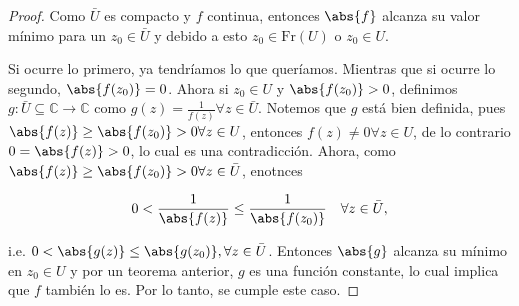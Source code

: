 \documentclass[../main.tex]{subfiles}
\begin{document}
\begin{proof}
    Como \(\bar{U}\) es compacto y \(f\) continua, entonces \(\abs{f}\) alcanza su valor
    mínimo para un \(z_{0}\in \bar{U}\) y debido a esto \(z_{0}\in \mathrm{Fr}(U)\) o
    \(z_{0}\in  U\).

    Si ocurre lo primero, ya tendríamos lo que queríamos. Mientras que si ocurre lo
    segundo, \(\abs{f(z_{0})} = 0\). Ahora si \(z_{0}\in  U\) y \(\abs{f(z_{0})} > 0\),
    definimos \(g \colon \bar{U}\subseteq \mathbb{C} \to \mathbb{C}\) como \(g(z) =
    \tfrac{1}{f(z)} \forall z\in \bar{U}\).
    Notemos que \(g\) está bien definida, pues \(\abs{f(z)} \geq
        \abs{f(z_{0})} > 0 \forall
    z\in U\), entonces \(f(z) \neq 0 \forall z\in U\), de lo contrario \(0 =
        \abs{f(z)} >
    0\), lo cual es una contradicción.
    Ahora, como \(\abs{f(z)} \geq \abs{f(z_{0})} > 0 \forall z\in \bar{U}\), enotnces

    \begin{equation*}
        0 < \dfrac{1}{\abs{f(z)}} \leq \dfrac{1}{\abs{f(z_{0})}}\quad \forall
        z\in \bar{U},
    \end{equation*}

    i.e. \(0 < \abs{g(z)} \leq \abs{g(z_{0})}, \forall z\in \bar{U}\).
    Entonces \(\abs{g}\)
    alcanza su mínimo en \(z_{0} \in U\) y por un teorema anterior, \(g\) es una función
    constante, lo cual implica que \(f\) también lo es. Por lo tanto, se
    cumple este caso.
\end{proof}
\end{document}
